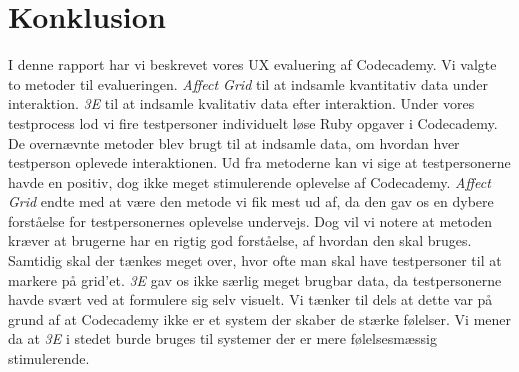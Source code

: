 \chapter{Konklusion}\label{ch:konk}
I denne rapport har vi beskrevet vores UX evaluering af Codecademy. Vi valgte to metoder til evalueringen. \textit{Affect Grid} til at indsamle kvantitativ data under interaktion. \textit{3E} til at indsamle kvalitativ data efter interaktion. Under vores testprocess lod vi fire testpersoner individuelt løse Ruby opgaver i Codecademy. De overnævnte metoder blev brugt til at indsamle data, om hvordan hver testperson oplevede interaktionen. Ud fra metoderne kan vi sige at testpersonerne havde en positiv, dog ikke meget stimulerende oplevelse af Codecademy. \textit{Affect Grid} endte med at være den metode vi fik mest ud af, da den gav os en dybere forståelse for testpersonernes oplevelse undervejs. Dog vil vi notere at metoden kræver at brugerne har en rigtig god forståelse, af hvordan den skal bruges. Samtidig skal der tænkes meget over, hvor ofte man skal have testpersoner til at markere på grid'et. \textit{3E} gav os ikke særlig meget brugbar data, da testpersonerne havde svært ved at formulere sig selv visuelt. Vi tænker til dels at dette var på grund af at Codecademy ikke er et system der skaber de stærke følelser. Vi mener da at \textit{3E} i stedet burde bruges til systemer der er mere følelsesmæssig stimulerende. 

